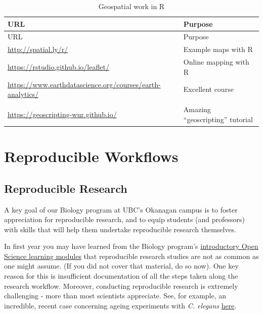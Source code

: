 \documentclass[
]{book}
\begin{document}
\begin{longtable}[]{@{}
  >{\raggedright\arraybackslash}p{}
  >{\raggedright\arraybackslash}p{}@{}}
\caption{Geospatial work in R}\tabularnewline
\toprule\noalign{}
\begin{minipage}[b]{\linewidth}\raggedright
URL
\end{minipage} & \begin{minipage}[b]{\linewidth}\raggedright
Purpose
\end{minipage} \\
\midrule\noalign{}
\endfirsthead
\toprule\noalign{}
\begin{minipage}[b]{\linewidth}\raggedright
URL
\end{minipage} & \begin{minipage}[b]{\linewidth}\raggedright
Purpose
\end{minipage} \\
\midrule\noalign{}
\endhead
\bottomrule\noalign{}
\endlastfoot
\url{http://spatial.ly/r/} & Example maps with R \\
\url{https://rstudio.github.io/leaflet/} & Online mapping with R \\
\url{https://www.earthdatascience.org/courses/earth-analytics/} & Excellent course \\
& \\
\url{https://geoscripting-wur.github.io/} & Amazing ``geoscripting'' tutorial \\
\end{longtable}

\part*{Reproducible Workflows}\label{part-reproducible-workflows}

\chapter{Reproducible Research}\label{repro_research}

A key goal of our Biology program at UBC's Okanagan campus is to foster appreciation for reproducible research, and to equip students (and professors) with skills that will help them undertake reproducible research themselves.

In first year you may have learned from the Biology program's \href{https://ubco-biology.github.io/OS-Introduction/}{introductory Open Science learning modules} that reproducible research studies are not as common as one might assume. (If you did not cover that material, do so now). One key reason for this is insufficient documentation of all the steps taken along the research workflow. Moreover, conducting reproducible research is extremely challenging - more than most scientists appreciate. See, for example, an incredible, recent case concerning ageing experiments with \emph{C. elegans} \href{https://www.nature.com/news/a-long-journey-to-reproducible-results-1.22478}{here}.
\end{document}

